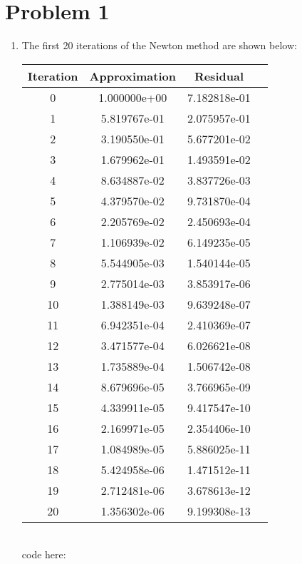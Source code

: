 \documentclass{article}
\title{\thetitle}
\author{\theauthor}
\begin{document}
\maketitle
\section*{Problem 1}
\begin{enumerate}[label=\alph*.)]
\item The first 20 iterations of the Newton method are shown below: \\
\begin{tabular}{|c|c|c|c|}
\hline
Iteration & Approximation & Residual\\
\hline
0 & 1.000000e+00 & 7.182818e-01\\
\hline
1 & 5.819767e-01 & 2.075957e-01\\
\hline
2 & 3.190550e-01 & 5.677201e-02\\
\hline
3 & 1.679962e-01 & 1.493591e-02\\
\hline
4 & 8.634887e-02 & 3.837726e-03\\
\hline
5 & 4.379570e-02 & 9.731870e-04\\
\hline
6 & 2.205769e-02 & 2.450693e-04\\
\hline
7 & 1.106939e-02 & 6.149235e-05\\
\hline
8 & 5.544905e-03 & 1.540144e-05\\
\hline
9 & 2.775014e-03 & 3.853917e-06\\
\hline
10 & 1.388149e-03 & 9.639248e-07\\
\hline
11 & 6.942351e-04 & 2.410369e-07\\
\hline
12 & 3.471577e-04 & 6.026621e-08\\
\hline
13 & 1.735889e-04 & 1.506742e-08\\
\hline
14 & 8.679696e-05 & 3.766965e-09\\
\hline
15 & 4.339911e-05 & 9.417547e-10\\
\hline
16 & 2.169971e-05 & 2.354406e-10\\
\hline
17 & 1.084989e-05 & 5.886025e-11\\
\hline
18 & 5.424958e-06 & 1.471512e-11\\
\hline
19 & 2.712481e-06 & 3.678613e-12\\
\hline
20 & 1.356302e-06 & 9.199308e-13\\
\hline
\end{tabular} \\ 
code here:\\

\end{enumerate}
\end{document}
